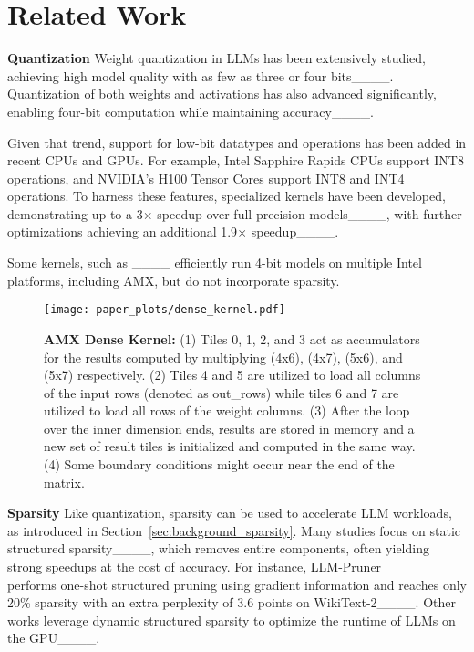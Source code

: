 \section{Related Work}
\textbf{Quantization} Weight quantization in LLMs has been extensively studied, achieving high model quality with as few as three or four bits____. Quantization of both weights and activations has also advanced significantly, enabling four-bit computation while maintaining accuracy____. 

Given that trend, support for low-bit datatypes and operations has been added in recent CPUs and GPUs. For example, Intel Sapphire Rapids CPUs support INT8 operations, and NVIDIA's H100 Tensor Cores support INT8 and INT4 operations. To harness these features, specialized kernels have been developed, demonstrating up to a 3$\times$ speedup over full-precision models____, with further optimizations achieving an additional 1.9$\times$ speedup____.

Some kernels, such as ____ efficiently run 4-bit models on multiple Intel platforms, including AMX, but do not incorporate sparsity.

\begin{figure*} [t]
    \centering
    \texttt{[image: paper\_plots/dense\_kernel.pdf]}
    \vspace{-10pt}
    \caption{\textbf{AMX Dense Kernel: }(1) Tiles 0, 1, 2, and 3 act as accumulators for the results computed by multiplying (4x6), (4x7), (5x6), and (5x7) respectively. (2) Tiles 4 and 5 are utilized to load all columns of the input rows (denoted as out\_rows) while tiles 6 and 7 are utilized to load all rows of the weight columns. (3) After the loop over the inner dimension ends, results are stored in memory and a new set of result tiles is initialized and computed in the same way. (4) Some boundary conditions might occur near the end of the matrix.}
    \label{fig:dense_kernel}
\end{figure*}

\textbf{Sparsity} Like quantization, sparsity can be used to accelerate LLM workloads, as introduced in Section~\ref{sec:background_sparsity}. Many studies focus on static structured sparsity____, which removes entire components, often yielding strong speedups at the cost of accuracy. For instance, LLM-Pruner____ performs one-shot structured pruning using gradient information and reaches only 20\% sparsity with an extra perplexity of 3.6 points on WikiText-2____. 
Other works leverage dynamic structured sparsity to optimize the runtime of LLMs on the GPU____.

